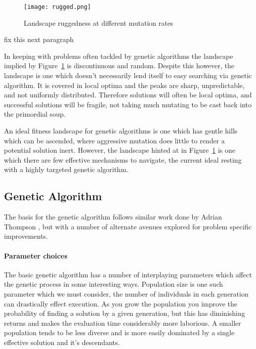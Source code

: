 \begin{figure}
	\centering
	\texttt{[image: rugged.png]}
	\caption{Landscape ruggedness at different mutation rates}
	\label{fig:rugged}
\end{figure}

\todo fix this next paragraph

In keeping with problems often tackled by genetic algorithms the landscape implied by Figure~\ref{fig:rugged}
is discontinuous
and random. Despite this however,
the landscape is one which doesn't necessarily lend itself to easy searching via genetic algorithm.
It is covered in local optima and the peaks are sharp, unpredictable, and not uniformly
distributed. Therefore solutions will often be local optima, and successful solutions will
be fragile, not taking much mutating to be cast back into the primordial soup.

An ideal fitness landscape for genetic algorithms is one which has gentle hills
which can be ascended, where aggressive mutation does little to render a potential
solution inert. However, the landscape hinted at in Figure~\ref{fig:rugged} is
one which there are few effective mechanisms to navigate, the current ideal resting
with a highly targeted genetic algorithm.

\subsection{Genetic Algorithm}

The basis for the genetic algorithm follows similar work done by Adrian Thompson
\cite{10.1007/3-540-63173-9_61}, but with a number of alternate avenues explored
for problem specific improvements.

\paragraph{Parameter choices}
The basic genetic algorithm has a number of interplaying parameters which affect the genetic
process in some interesting ways. Population size is one such parameter which we must consider,
the number of individuals in each generation can drastically effect execution. As you grow the
population you improve the probability of finding a solution by a given generation, but this has
diminishing returns and makes the evaluation time considerably more laborious. A smaller population
tends to be less diverse and is more easily dominated by a single effective solution
and it's descendants.


